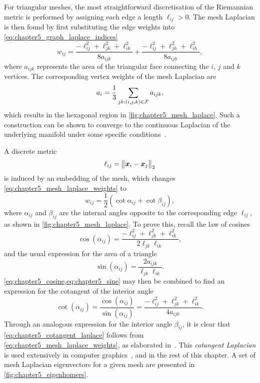 For triangular meshes, the most straightforward discretisation of the Riemannian metric is performed by assigning each edge a length \(\ell_{i j}>0\).
The mesh Laplacian is then found by first substituting the edge weights into \cref{eq:chapter5_graph_laplace_indices}
%
\begin{equation}\label{eq:chapter5_mesh_laplace_weights}
	w_{i j}
	= \frac{-\ell_{i j}^{2} + \ell_{j k}^{2} + \ell_{i k}^{2}}{8 a_{i j k}}
	+ \frac{-\ell_{i j}^{2} + \ell_{j h}^{2} + \ell_{i h}^{2}}{8 a_{i j h}},
\end{equation}
%
where \(a_{i j k}\) represents the area of the triangular face connecting the \(i\), \(j\) and \(k\) vertices.
The corresponding vertex weights of the mesh Laplacian are
%
\begin{equation}\label{eq:chapter5_vertex_weight}
	a_{i}
	= \frac{1}{3} \sum\limits_{j k : (i,j,k) \in \mathcal{F}} a_{i j k},
\end{equation}
%
which results in the hexagonal region in \cref{fig:chapter5_mesh_laplace}.
Such a construction can be shown to converge to the continuous Laplacian of the underlying manifold under some specific conditions~\cite{Wardetzky2008}.

A discrete metric
%
\begin{equation}
	\ell_{i j}
	= {\big\lVert\vb*{x}_{i} - \vb*{x}_{j}\big\rVert}_{2}
\end{equation}
%
is induced by an embedding of the mesh, which changes \cref{eq:chapter5_mesh_laplace_weights} to
%
\begin{equation}\label{eq:chapter5_cotangent_laplace}
	w_{i j}
	= \frac{1}{2}(\cot{\alpha_{i j}} + \cot{\beta_{i j}}),
\end{equation}
%
where \(\alpha_{i j}\) and \(\beta_{i j}\) are the internal angles opposite to the corresponding edge \(\ell_{i j}\), as shown in \cref{fig:chapter5_mesh_laplace}.
To prove this, recall the law of cosines
%
\begin{equation}\label{eq:chapter5_cosine}
	\cos(\alpha_{i j})
	= \frac{-\ell_{i j}^{2} + \ell_{j k}^{2} + \ell_{i k}^{2}}{2\ell_{j k}\ell_{i k}},
\end{equation}
%
and the usual expression for the area of a triangle
%
\begin{equation}\label{eq:chapter5_sine}
	\sin(\alpha_{i j})
	= \frac{2a_{i j k}}{\ell_{j k} \ell_{i k}}.
\end{equation}
%
\cref{eq:chapter5_cosine,eq:chapter5_sine} may then be combined to find an expression for the cotangent of the interior angle
%
\begin{equation}
	\cot(\alpha_{i j})
	= \frac{\cos(\alpha_{i j})}{\sin(\alpha_{i j})}
	= \frac{-\ell_{i j}^{2} + \ell_{j k}^{2} + \ell_{i k}^{2}}{4a_{i j k}}.
\end{equation}
%
Through an analogous expression for the interior angle \(\beta_{i j}\), it is clear that \cref{eq:chapter5_cotangent_laplace} follows from \cref{eq:chapter5_mesh_laplace_weights}, as elaborated in~\cite{Meyer2003}.
This \emph{cotangent Laplacian} is used extensively in computer graphics~\cite{Pinkall1993}, and in the rest of this chapter.
A set of mesh Laplacian eigenvectors for a given mesh are presented in \cref{fig:chapter5_eigenhomers}.

